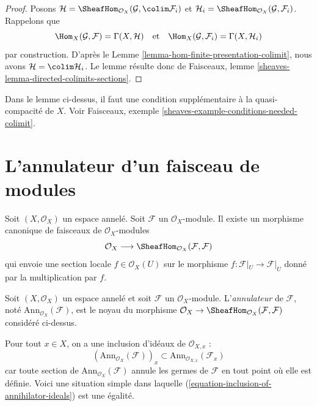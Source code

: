 \begin{proof}
Posons
$\mathcal{H} = \SheafHom_{\mathcal{O}_X}(\mathcal{G}, \colim \mathcal{F}_i)$
et $\mathcal{H}_i = \SheafHom_{\mathcal{O}_X}(\mathcal{G}, \mathcal{F}_i)$.
Rappelons que
$$
\Hom_X(\mathcal{G}, \mathcal{F}) = \Gamma(X, \mathcal{H})
\quad\text{et}\quad
\Hom_X(\mathcal{G}, \mathcal{F}_i) = \Gamma(X, \mathcal{H}_i)
$$
par construction. D'après le Lemme \ref{lemma-hom-finite-presentation-colimit}, nous avons
$\mathcal{H} = \colim \mathcal{H}_i$. Le lemme résulte donc de
Faisceaux, lemme \ref{sheaves-lemma-directed-colimits-sections}.
\end{proof}

\begin{remark}
\label{remark-condition-necessary}
Dans le lemme ci-dessus, il faut une condition supplémentaire à la
quasi-compacité de $X$. Voir
Faisceaux, exemple \ref{sheaves-example-conditions-needed-colimit}.
\end{remark}




\section{L'annulateur d'un faisceau de modules}
\label{section-annihilator}

\noindent
Soit $(X, \mathcal{O}_X)$ un espace annelé.
Soit $\mathcal{F}$ un $\mathcal{O}_X$-module.
Il existe un morphisme canonique de faisceaux de $\mathcal{O}_X$-modules
$$
\mathcal{O}_X
\longrightarrow
\SheafHom_{\mathcal{O}_X}(\mathcal{F}, \mathcal{F})
$$
qui envoie une section locale $f \in \mathcal{O}_X(U)$ sur le morphisme
$f : \mathcal{F}|_U \to \mathcal{F}|_U$ donné par la multiplication par $f$.

\begin{definition}
\label{definition-annihilator-sheaf}
Soit $(X, \mathcal{O}_X)$ un espace annelé et soit $\mathcal{F}$
un $\mathcal{O}_X$-module. L'{\it annulateur} de $\mathcal{F}$,
noté $\text{Ann}_{\mathcal{O}_X}(\mathcal{F})$,
est le noyau du morphisme
$\mathcal{O}_X \to \SheafHom_{\mathcal{O}_X}(\mathcal{F}, \mathcal{F})$
considéré ci-dessus.
\end{definition}

\noindent
Pour tout $x\in X$, on a une inclusion d'idéaux de $\mathcal{O}_{X, x}$ :
\begin{equation}
\label{equation-inclusion-of-annihilator-ideals}
(\text{Ann}_{\mathcal{O}_X}(\mathcal{F}))_x
\subset
\text{Ann}_{\mathcal{O}_{X, x}}(\mathcal{F}_x)
\end{equation}
car toute section de $\text{Ann}_{\mathcal{O}_X}(\mathcal{F})$
annule les germes de $\mathcal{F}$ en tout point où elle est
définie. Voici une situation simple dans laquelle
(\ref{equation-inclusion-of-annihilator-ideals}) est une égalité.

